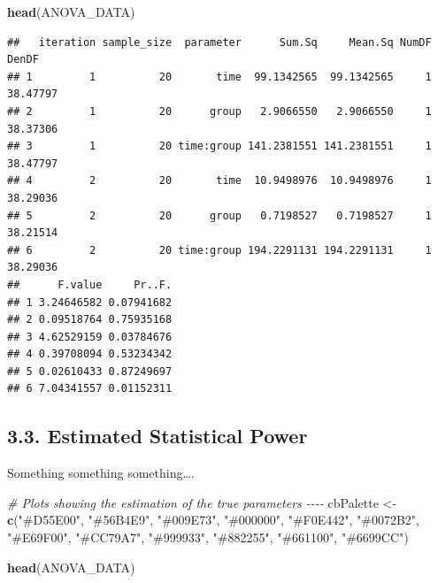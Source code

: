 \documentclass[
]{article}
\newenvironment{Shaded}{\begin{snugshade}}{\end{snugshade}}
\newcommand{\CommentTok}[1]{\textcolor[rgb]{0.56,0.35,0.01}{\textit{#1}}}
\newcommand{\FunctionTok}[1]{\textcolor[rgb]{0.13,0.29,0.53}{\textbf{#1}}}
\newcommand{\NormalTok}[1]{#1}
\newcommand{\OtherTok}[1]{\textcolor[rgb]{0.56,0.35,0.01}{#1}}
\newcommand{\StringTok}[1]{\textcolor[rgb]{0.31,0.60,0.02}{#1}}
\begin{document}
\begin{Shaded}
\begin{Highlighting}[]
\FunctionTok{head}\NormalTok{(ANOVA\_DATA)}
\end{Highlighting}
\end{Shaded}

\begin{verbatim}
##   iteration sample_size  parameter      Sum.Sq     Mean.Sq NumDF    DenDF
## 1         1          20       time  99.1342565  99.1342565     1 38.47797
## 2         1          20      group   2.9066550   2.9066550     1 38.37306
## 3         1          20 time:group 141.2381551 141.2381551     1 38.47797
## 4         2          20       time  10.9498976  10.9498976     1 38.29036
## 5         2          20      group   0.7198527   0.7198527     1 38.21514
## 6         2          20 time:group 194.2291131 194.2291131     1 38.29036
##      F.value     Pr..F.
## 1 3.24646582 0.07941682
## 2 0.09518764 0.75935168
## 3 4.62529159 0.03784676
## 4 0.39708094 0.53234342
## 5 0.02610433 0.87249697
## 6 7.04341557 0.01152311
\end{verbatim}

\hypertarget{estimated-statistical-power}{%
\subsection{3.3. Estimated Statistical
Power}\label{estimated-statistical-power}}

Something something something\ldots.

\begin{Shaded}
\begin{Highlighting}[]
\CommentTok{\# Plots showing the estimation of the true parameters {-}{-}{-}{-}}
\NormalTok{cbPalette }\OtherTok{\textless{}{-}} \FunctionTok{c}\NormalTok{(}\StringTok{"\#D55E00"}\NormalTok{, }\StringTok{"\#56B4E9"}\NormalTok{, }\StringTok{"\#009E73"}\NormalTok{, }\StringTok{"\#000000"}\NormalTok{, }
               \StringTok{"\#F0E442"}\NormalTok{, }\StringTok{"\#0072B2"}\NormalTok{, }\StringTok{"\#E69F00"}\NormalTok{, }\StringTok{"\#CC79A7"}\NormalTok{,}
               \StringTok{"\#999933"}\NormalTok{, }\StringTok{"\#882255"}\NormalTok{, }\StringTok{"\#661100"}\NormalTok{, }\StringTok{"\#6699CC"}\NormalTok{)}


\FunctionTok{head}\NormalTok{(ANOVA\_DATA)}
\end{Highlighting}
\end{Shaded}
\end{document}
